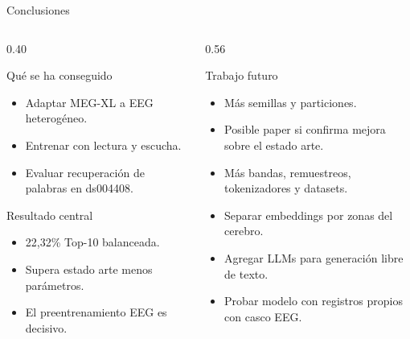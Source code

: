 \documentclass[aspectratio=169,10pt]{beamer}
\begin{document}
\begin{frame}[c]{Conclusiones}
  \small
  \begin{columns}[c,totalwidth=\linewidth]
    \begin{column}{0.40\linewidth}
      \begin{block}{Qué se ha conseguido}
        \begin{itemize}
          \item Adaptar MEG-XL a EEG heterogéneo.
          \item Entrenar con lectura y escucha.
          \item Evaluar recuperación de palabras en ds004408.
        \end{itemize}
      \end{block}

      \vspace{3mm}

      \begin{exampleblock}{Resultado central}
        \begin{itemize}
          \item 22,32\% Top-10 balanceada.
          \item Supera estado arte menos parámetros.
          \item El preentrenamiento EEG es decisivo.
        \end{itemize}
      \end{exampleblock}
    \end{column}
    \hfill

    \begin{column}{0.56\linewidth}
      \begin{block}{Trabajo futuro}
        \begin{itemize}
          \item Más semillas y particiones.
          \item Posible paper si confirma mejora sobre el estado arte.
          \item Más bandas, remuestreos, tokenizadores y datasets.
          \item Separar embeddings por zonas del cerebro.
          \item Agregar LLMs para generación libre de texto.
          \item Probar modelo con registros propios con casco EEG.
        \end{itemize}
      \end{block}
    \end{column}
  \end{columns}

\end{frame}
\end{document}
